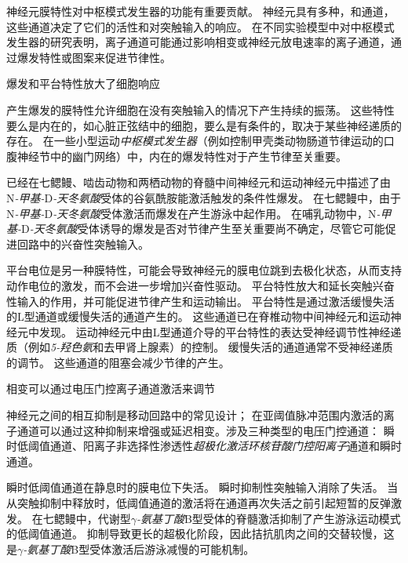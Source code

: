 \begin{proposition}[神经元离子通道有助于中枢模式发生器功能] \label{box:33_2}
	
	\quad \quad 神经元膜特性对中枢模式发生器的功能有重要贡献。
	神经元具有多种，和通道，这些通道决定了它们的活性和对突触输入的响应。
	在不同实验模型中对中枢模式发生器的研究表明，离子通道可能通过影响相变或神经元放电速率的离子通道，通过爆发特性或图案来促进节律性。
	
	\quad \quad 爆发和平台特性放大了细胞响应
	
	\quad \quad 产生爆发的膜特性允许细胞在没有突触输入的情况下产生持续的振荡。
	这些特性要么是内在的，如心脏正弦结中的细胞，要么是有条件的，取决于某些神经递质的存在。
	在一些小型运动\textit{中枢模式发生器}（例如控制甲壳类动物肠道节律运动的口腹神经节中的幽门网络）中，内在的爆发特性对于产生节律至关重要。
	
	\quad \quad 已经在七鳃鳗、啮齿动物和两栖动物的脊髓中间神经元和运动神经元中描述了由N\textit{-甲基-}D\textit{-天冬氨酸}受体的谷氨酰胺能激活触发的条件性爆发。
	在七鳃鳗中，由于N\textit{-甲基-}D\textit{-天冬氨酸}受体激活而爆发在产生游泳中起作用。
	在哺乳动物中，N\textit{-甲基-}D\textit{-天冬氨酸}受体诱导的爆发是否对节律产生至关重要尚不确定，尽管它可能促进回路中的兴奋性突触输入。
	
	\quad \quad 平台电位是另一种膜特性，可能会导致神经元的膜电位跳到去极化状态，从而支持动作电位的激发，而不会进一步增加兴奋性驱动。
	平台特性放大和延长突触兴奋性输入的作用，并可能促进节律产生和运动输出。
	平台特性是通过激活缓慢失活的L型通道或缓慢失活的通道产生的。
	这些通道已在脊椎动物中间神经元和运动神经元中发现。
	运动神经元中由L型通道介导的平台特性的表达受神经调节性神经递质（例如\textit{5-羟色氨}和去甲肾上腺素）的控制。
	缓慢失活的通道通常不受神经递质的调节。
	这些通道的阻塞会减少节律的产生。
	
	\quad \quad 相变可以通过电压门控离子通道激活来调节
	
	\quad \quad 神经元之间的相互抑制是移动回路中的常见设计；
	在亚阈值脉冲范围内激活的离子通道可以通过这种抑制来增强或延迟相变。涉及三种类型的电压门控通道：
	瞬时低阈值通道、阳离子非选择性渗透性\textit{超极化激活环核苷酸门控阳离子}通道和瞬时通道。
	
	\quad \quad 瞬时低阈值通道在静息时的膜电位下失活。
	瞬时抑制性突触输入消除了失活。
	当从突触抑制中释放时，低阈值通道的激活将在通道再次失活之前引起短暂的反弹激发。
	在七鳃鳗中，代谢型\textit{$\gamma$-氨基丁酸}B型受体的脊髓激活抑制了产生游泳运动模式的低阈值通道。
	抑制导致更长的超极化阶段，因此拮抗肌肉之间的交替较慢，这是\textit{$\gamma$-氨基丁酸}B型受体激活后游泳减慢的可能机制。
	

\end{proposition}

